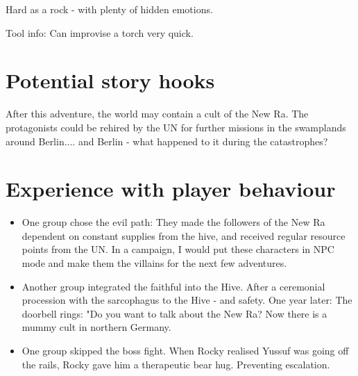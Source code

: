 \begin{npcBox}[title=Lost: Rocky]
    \begin{stressSection}
    \end{stressSection}
    \begin{tabularx}{\textwidth}{ XX }
    \end{tabularx}

    \begin{consequences}
    \item {}
    \item {}
    \item {}
    \end{consequences}

    \begin{npcDescription}

    Hard as a rock - with plenty of hidden emotions.

    Tool info: Can improvise a torch very quick.

    \end{npcDescription}

\end{npcBox}

\newpage



\section{Potential story hooks}

After this adventure, the world may contain a cult of the New Ra. The protagonists could be rehired by the UN for further missions in the swamplands around Berlin.... and Berlin - what happened to it during the catastrophes?

\section{Experience with player behaviour}

\begin{itemize}
    \item One group chose the evil path: They made the followers of the New Ra dependent on constant supplies from the hive, and received regular resource points from the UN. In a campaign, I would put these characters in NPC mode and make them the villains for the next few adventures.
    \item Another group integrated the faithful into the Hive. After a ceremonial procession with the sarcophagus to the Hive - and safety. One year later: The doorbell rings: "Do you want to talk about the New Ra? Now there is a mummy cult in northern Germany.
    \item One group skipped the boss fight. When Rocky realised Yussuf was going off the rails, Rocky gave him a therapeutic bear hug. Preventing escalation.
\end{itemize}


